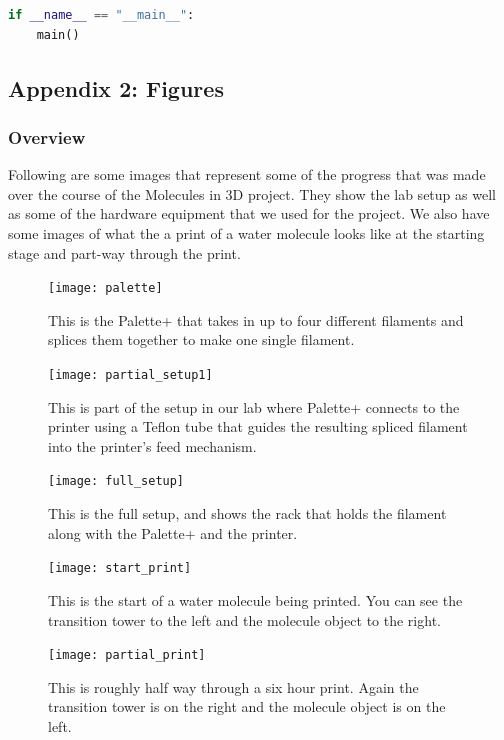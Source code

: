 \documentclass[letterpaper, onecolumn, draftclsnofoot, 10pt, compsoc]{IEEEtran}
\begin{document}
\begin{singlespace}
\begin{lstlisting}[language=Python]
if __name__ == "__main__":
    main()
\end{lstlisting}

\subsection{Appendix 2: Figures}
\subsubsection{Overview}
Following are some images that represent some of the progress that was made over the course of the Molecules in 3D project. 
They show the lab setup as well as some of the hardware equipment that we used for the project. 
We also have some images of what the a print of a water molecule looks like at the starting stage and part-way through the print.
\begin{figure}[H]
\centering
\texttt{[image: palette]}
\caption{This is the Palette+ that takes in up to four different filaments and splices them together to make one single filament.}
\end{figure}
\begin{figure}[H]
\centering
\texttt{[image: partial\_setup1]}
\caption{This is part of the setup in our lab where Palette+ connects to the printer using a Teflon tube that guides the resulting spliced filament into the printer's feed mechanism.}
\end{figure}
\begin{figure}[H]
\centering
\texttt{[image: full\_setup]}
\caption{This is the full setup, and shows the rack that holds the filament along with the Palette+ and the printer.}
\end{figure}
\begin{figure}[H]
\centering
\texttt{[image: start\_print]}
\caption{This is the start of a water molecule being printed. You can see the transition tower to the left and the molecule object to the right.}
\end{figure}
\begin{figure}[H]
\centering
\texttt{[image: partial\_print]}
\caption{This is roughly half way through a six hour print. Again the transition tower is on the right and the molecule object is on the left.}
\end{figure}

\end{singlespace}
\end{document}
